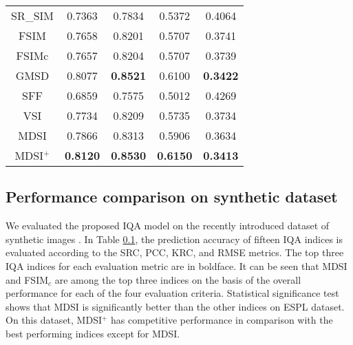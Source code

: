 \begin{table}[htb]
\begin{tabular}{c|cccc}
SR\_SIM \cite{SRSIM}                       & 0.7363                              & 0.7834                              & 0.5372                              & 0.4064                              \\
FSIM \cite{FSIM}                          & 0.7658                              & 0.8201                              & 0.5707                              & 0.3741                              \\
FSIMc \cite{FSIM}                         & 0.7657                              & 0.8204                              & 0.5707                              & 0.3739                              \\
GMSD \cite{GMSD}                          & 0.8077                              & \textbf{0.8521}                     & 0.6100                              & \textbf{0.3422}                     \\
SFF \cite{SFF}                           & 0.6859                              & 0.7575                              & 0.5012                              & 0.4269                              \\
VSI \cite{VSI}                           & 0.7734                              & 0.8209                              & 0.5735                              & 0.3734                              \\
MDSI                          & 0.7866                              & 0.8313                              & 0.5906                              & 0.3634                              \\
MDSI$^+$ & \textbf{0.8120} & \textbf{0.8530} & \textbf{0.6150} & \textbf{0.3413} \\ \hline
\end{tabular}
\end{table}




\subsection{Performance comparison on synthetic dataset}
\label{synthetic}

We evaluated the proposed IQA model on the recently introduced dataset of synthetic images \cite{ESPL}. In Table \ref{synthetic}, the prediction accuracy of fifteen IQA indices is evaluated according to the SRC, PCC, KRC, and RMSE metrics. The top three IQA indices for each evaluation metric are in boldface. It can be seen that MDSI and FSIM$_c$ are among the top three indices on the basis of the overall performance for each of the four evaluation criteria. Statistical significance test shows that MDSI is significantly better than the other indices on ESPL dataset. On this dataset, MDSI$^+$ has competitive performance in comparison with the best performing indices except for MDSI. 

